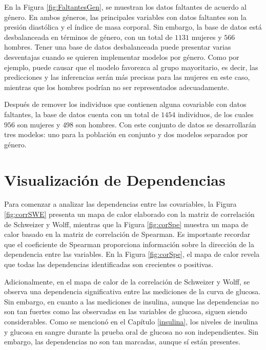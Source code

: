 En la Figura \ref{fig:FaltantesGen}, se muestran los datos faltantes de acuerdo al género. En ambos géneros, las principales variables con datos faltantes son la presión diastólica y el índice de masa corporal. Sin embargo, la base de datos está desbalanceada en términos de género, con un total de $1131$ mujeres y $566$ hombres. Tener una base de datos desbalanceada puede presentar varias desventajas cuando se quieren implementar modelos por género. Como por ejemplo, puede causar que el modelo favorezca al grupo mayoritario, es decir, las predicciones y las inferencias serán más precisas para las mujeres en este caso, mientras que los hombres podrían no ser representados adecuadamente.

Después de remover los individuos que contienen alguna covariable con datos faltantes, la base de datos cuenta con un total de $1454$ individuos, de los cuales $956$ son mujeres y $498$ son hombres. Con este conjunto de datos se desarrollarán tres modelos: uno para la población en conjunto y dos modelos separados por género.


\section{Visualización de Dependencias}

Para comenzar a analizar las dependencias entre las covariables, la Figura \ref{fig:corrSWE} presenta un mapa de calor elaborado con la matriz de correlación de Schweizer y Wolff, mientras que la Figura \ref{fig:corSpe} muestra un mapa de calor basado en la matriz de correlación de Spearman. Es importante recordar que el coeficiente de Spearman proporciona información sobre la dirección de la dependencia entre las variables. En la Figura \ref{fig:corSpe}, el mapa de calor revela que todas las dependencias identificadas son crecientes o positivas.

Adicionalmente, en el mapa de calor de la correlación de Schweizer y Wolff, se observa una dependencia significativa entre las mediciones de la curva de glucosa. Sin embargo, en cuanto a las mediciones de insulina, aunque las dependencias no son tan fuertes como las observadas en las variables de glucosa, siguen siendo considerables. Como se mencionó en el Capítulo \ref{insulina}, los niveles de insulina y glucosa en sangre durante la prueba oral de glucosa no son independientes. Sin embargo, las dependencias no son tan marcadas, aunque sí están presentes. 

